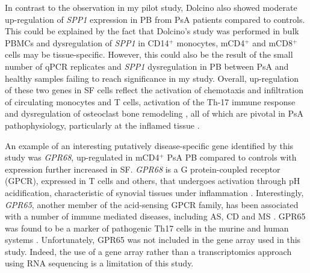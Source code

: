 In contrast to the observation in my pilot study, Dolcino also showed moderate up-regulation of \textit{SPP1} expression in PB from PsA patients compared to controls. This could be explained by the fact that Dolcino's study was performed in bulk PBMCs and dysregulation of \textit{SPP1} in CD14$^+$ monocytes, mCD4$^+$ and mCD8$^+$ cells may be tissue-specific. However, this could also be the result of the small number of qPCR replicates and \textit{SPP1} dysregulation in PB between PsA and healthy samples failing to reach significance in my study. Overall, up-regulation of these two genes in SF cells reflect the activation of chemotaxis and  infiltration of circulating monocytes and T cells,  activation of the Th-17 immune response and dysregulation of osteoclast bone remodeling , all of which are pivotal in PsA pathophysiology, particularly at the inflamed tissue \parencite{Durham2015, Mensah2017}.

An example of an interesting putatively disease-specific gene identified by this study was \textit{GPR68}, up-regulated in mCD4$^+$ PsA PB compared to controls with expression further increased in SF. \textit{GPR68} is a G protein-coupled receptor (GPCR), expressed in T cells and others, that undergoes activation through pH acidification, characteristic of synovial tissues under inflammation \parencite{Biniecka2016, Saxena2011}. Interestingly, \textit{GPR65}, another member of the acid-sensing GPCR family, has been associated with a number of immune mediated diseases, including AS, CD and MS \parencite{Cortes2013,Lassen2016,Wirasinha2018}. GPR65 was found to be a marker of pathogenic Th17 cells in the murine and human systems \parencite{Gaublomme2015, Al-Mossawi 2017}. Unfortunately, GPR65 was not included in the gene array used in this study. Indeed, the use of a gene array rather than a transcriptomics approach using RNA sequencing is a limitation of this study. 


